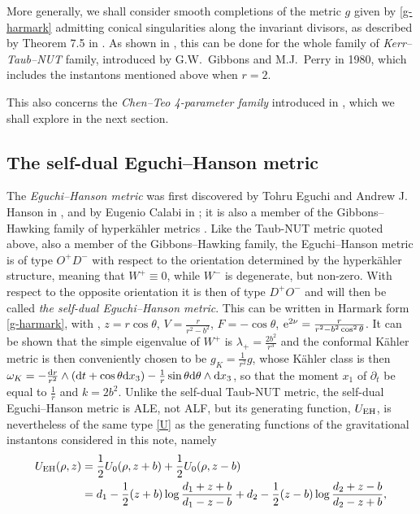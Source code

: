 \documentclass[10pt,a4paper]{amsart}
\numberwithin{equation}{section}
\begin{document}
More generally, we shall consider smooth completions of the metric $g$ given by \eqref{g-harmark} admitting conical singularities along the invariant divisors, as described by Theorem 7.5 in \cite[Section~7]{BG}. As shown in \cite[Section~7]{BG}, this can be done for the whole family of {\it Kerr--Taub--NUT} family, introduced by G.W.~Gibbons and M.J.~Perry in 1980, which includes the instantons mentioned above when $r = 2$.

This also concerns the {\it Chen--Teo {\rm 4}-parameter family} introduced in \cite{CT3}, which we shall explore in the next section.

\subsection{The self-dual Eguchi--Hanson metric}\label{sec:self-dual-eguchi} The {\it Eguchi--Hanson metric} was first discovered by Tohru Eguchi and Andrew J. Hanson in \cite{EH}, and by Eugenio Calabi in \cite{calabi}; it is also a member of the Gibbons--Hawking family of hyperk\"ahler metrics \cite{GH}. Like the Taub-NUT metric quoted above, also a member of the Gibbons--Hawking family, the Eguchi--Hanson metric is of type $O^+ D^-$ with respect to the orientation determined by the hyperk\"ahler structure, meaning that $W^+ \equiv 0$, while $W^-$ is degenerate, but non-zero. With respect to the opposite
orientation it is then of type $D^+O^-$ and will then be called {\it the self-dual Eguchi--Hanson metric}. This can be written in Harmark form \eqref{g-harmark}, with , $z = r \cos{\theta}$, $V = \frac{r}{r^2 - b^2}$, $F = - \cos{\theta}$, ${\rm e}^{2 \nu} = \frac{r}{r^2 - b^2 \cos ^2{\theta}}$. It can be shown that the simple eigenvalue of $W^+$ is $\lambda _+ = \frac{2 b ^2}{r ^3}$ and the conformal K\"ahler metric is then conveniently chosen to be $g _K = \frac{1}{r^2} g$, whose K\"ahler class is then $\omega _K = - \frac{{\rm d}r}{r^2} \wedge ({\rm d}t + \cos{\theta} {\rm d} x_3) - \frac{1}{r} \sin{\theta} {\rm d}\theta \wedge {\rm d} x_3$, so that the moment $x_1$ of $\partial _t$ be equal to $\frac{1}{r}$ and $k = 2 b^2$.
Unlike the self-dual Taub-NUT metric, the self-dual Eguchi--Hanson metric is ALE, not ALF, but its generating function, $U_{\rm EH}$, is nevertheless of the same type \eqref{U} as the generating functions of the gravitational instantons considered in this note, namely
\begin{align*} U_{\rm EH} (\rho, z) & = \frac{1}{2} U_0(\rho, z + b) + \frac{1}{2} U_0 (\rho, z - b) \\ & = d_1 - \frac{1}{2} (z + b) \log{\frac{d_1 + z + b}{d_1 - z - b}} + d_2 - \frac{1}{2} (z - b) \log{\frac{d_2 + z - b}{d_2 - z + b}}, \end{align*}
\end{document}
